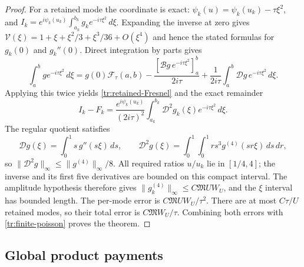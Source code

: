 \documentclass[11pt]{article}
\numberwithin{equation}{section}
\theoremstyle{definition}
\theoremstyle{remark}
\begin{document}
\begin{proof}
For a retained mode the coordinate is exact:
$\psi_k(u)=\psi_k(u_k)-\tau\xi^2$, and
$I_k=e^{i\psi_k(u_k)}\int_{a_k}^{b_k}g_k e^{-i\tau\xi^2}\,d\xi$.
Expanding the inverse at zero gives
$\mathcal V(\xi)=1+\xi+\xi^2/3+\xi^3/36+O(\xi^4)$ and hence the
stated formulas for $g_k(0)$ and $g_k''(0)$.  Direct integration by
parts gives
\[
 \int_a^bge^{-i\tau\xi^2}\,d\xi
 =g(0)\mathcal F_\tau(a,b)
 -\frac{[\mathcal Bg\,e^{-i\tau\xi^2}]_a^b}{2i\tau}
 +\frac1{2i\tau}\int_a^b\mathcal Dg\,e^{-i\tau\xi^2}\,d\xi.
\]
Applying this twice yields \eqref{tr:retained-Fresnel} and the exact
remainder
\[
 I_k-F_k=
 \frac{e^{i\psi_k(u_k)}}{(2i\tau)^2}
 \int_{a_k}^{b_k}\mathcal D^2g_k(\xi)e^{-i\tau\xi^2}\,d\xi.
\]
The regular quotient satisfies
\[
 \mathcal Dg(\xi)=\int_0^1s\,g''(s\xi)\,ds,\qquad
 \mathcal D^2g(\xi)=\int_0^1\!\int_0^1r s^3
              g^{(4)}(sr\xi)\,ds\,dr,
\]
so $\|\mathcal D^2g\|_\infty\le\|g^{(4)}\|_\infty/8$.
All required ratios $u/u_k$ lie in $[1/4,4]$; the inverse and its first
five derivatives are bounded on this compact interval.  The amplitude
hypothesis therefore gives $\|g_k^{(4)}\|_\infty\le
C\mathfrak M UW_U$, and the $\xi$ interval has bounded length.
The per-mode error is $C\mathfrak M UW_U/\tau^2$.  There are at most
$C\tau/U$ retained modes, so their total error is
$C\mathfrak M W_U/\tau$.  Combining both errors with
\eqref{tr:finite-poisson} proves the theorem.
\end{proof}

\subsection{Global product payments}
\end{document}
